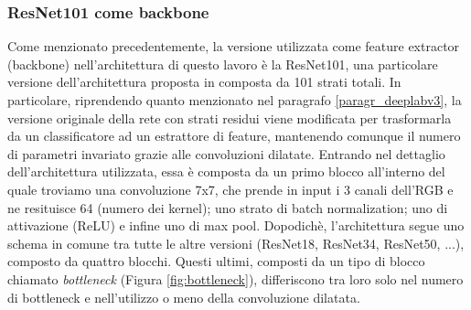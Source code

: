 \subsubsection{ResNet101 come backbone}
Come menzionato precedentemente, la versione utilizzata come feature extractor (backbone) nell'architettura di questo lavoro è la ResNet101, una particolare versione dell'architettura proposta in \cite{resnets} composta da 101 strati totali. In particolare, riprendendo quanto menzionato nel paragrafo \ref{paragr_deeplabv3}, la versione originale della rete con strati residui viene modificata per trasformarla da un classificatore ad un estrattore di feature, mantenendo comunque il numero di parametri invariato grazie alle convoluzioni dilatate. Entrando nel dettaglio dell'architettura utilizzata, essa è composta da un primo blocco all'interno del quale troviamo una convoluzione 7x7, che prende in input i 3 canali dell'RGB e ne resituisce 64 (numero dei kernel); uno strato di batch normalization; uno di attivazione (ReLU) e infine uno di max pool. Dopodichè, l'architettura segue uno schema in comune tra tutte le altre versioni (ResNet18, ResNet34, ResNet50, ...), composto da quattro blocchi. Questi ultimi, composti da un tipo di blocco chiamato \textit{bottleneck} (Figura \ref{fig:bottleneck}), differiscono tra loro solo nel numero di bottleneck e nell'utilizzo o meno della convoluzione dilatata.


